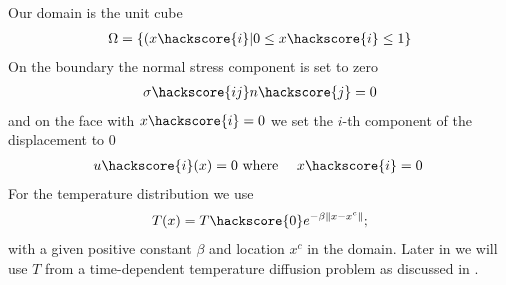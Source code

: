 Our domain is the unit cube 
\begin{eqnarray} \label{HEATEDBLOCK natural location}
\Omega=\{(x\hackscore{i} | 0 \le x\hackscore{i} \le 1 \}
\end{eqnarray}
On the boundary the normal stress component is set to zero
\begin{eqnarray} \label{HEATEDBLOCK natural}
\sigma\hackscore{ij}n\hackscore{j}=0
\end{eqnarray}
and on the face with $x\hackscore{i}=0$ we set the $i$-th component of the displacement to $0$
\begin{eqnarray} \label{HEATEDBLOCK constraint}
u\hackscore{i}(x)=0 & \mbox{ where } & x\hackscore{i}=0 \; 
\end{eqnarray}
For the temperature distribution we use 
\begin{eqnarray} \label{HEATEDBLOCK temperature}
T(x)= T\hackscore{0} e^{-\beta \|x-x^{c}\|}; 
\end{eqnarray}
with a given positive constant $\beta$ and location $x^{c}$ in the domain. Later in  we will use
$T$ from a time-dependent temperature diffusion problem as discussed in .

